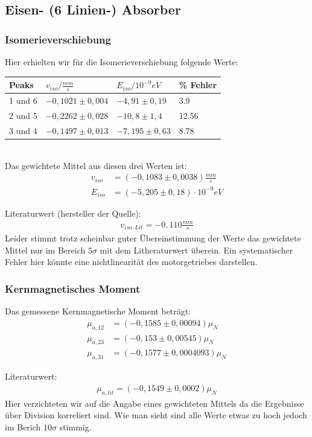 \documentclass[12pt]{article}
\begin{document}
\subsection*{Eisen- (6 Linien-) Absorber}
\subsubsection*{Isomerieverschiebung}
Hier erhielten wir für die Isomerieverschiebung folgende Werte: \\

\begin{tabular}{|l|lll|}
\hline
Peaks & $v_{iso}/\frac{mm}{s}$ & $E_{iso}/10^{-9}eV$ & \% Fehler\\
\hline
1 und 6& $-0,1021 \pm 0,004$ & $-4,91 \pm 0,19$ & 3.9\\
2 und 5& $-0,2262 \pm 0,028$ & $-10,8 \pm 1,4$ & 12.56\\
3 und 4& $-0,1497 \pm 0,013$ & $-7,195 \pm 0,63$ & 8.78\\
\hline
\end{tabular} \\

Das gewichtete Mittel aus diesen drei Werten ist:
\begin{align*}
  v_{iso} &= ( -0,1083 \pm 0,0038) \frac{mm}{s} \\
 E_{iso} &= ( -5,205 \pm 0,18 ) \cdot 10^{-9} eV
\end{align*}

Literaturwert (hersteller der Quelle):
\begin{align*}
 v_{iso,Lit} = -0,110 \frac{mm}{s}
\end{align*}
Leider stimmt trotz scheinbar guter Übereinstimmung der Werte das gewichtete Mittel nur im Bereich $5\sigma$ mit dem Litheraturwert überein. Ein systematischer Fehler hier könnte eine nichtlinearität des motorgetriebes darstellen.

\subsubsection*{Kernmagnetisches Moment}
Das gemessene Kernmagnetische Moment beträgt:
\begin{align}
\mu_{a,12} &=  (-0,1585 \pm 0,00094) \mu_N \\
\mu_{a,23} &=  (-0,153 \pm 0,00545) \mu_N \\
\mu_{a,31} &=  (-0,1577 \pm 0,0004093) \mu_N 
\end{align}

Literaturwert:
\begin{align*}
\mu_{a,lit} = (-0,1549 \pm 0,0002) \mu_N
\end{align*}
Hier verzichteten wir auf die Angabe eines gewichteten Mittels da die Ergebnisse über Division korreliert sind. Wie man sieht sind alle Werte etwas zu hoch
jedoch im Berich $10\sigma$ stimmig.
\end{document}
